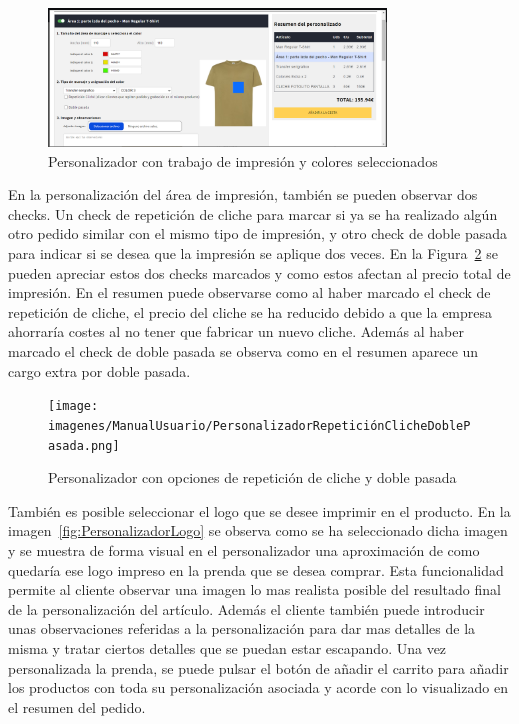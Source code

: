 \documentclass[11pt]{article}
\begin{document}
\begin{figure}[H]
    \centering
    \includegraphics[width=0.8\textwidth]{imagenes/ManualUsuario/PersonalizadorArea1ColoresSeleccionados.png}
    \caption{\label{fig:PersonalizadorColores}Personalizador con trabajo de impresión y colores seleccionados}
    \vspace{\fill}
\end{figure}

En la personalización del área de impresión, también se pueden observar dos checks. Un check de repetición de cliche para marcar si ya se ha realizado algún otro pedido similar con el mismo tipo de impresión,
y otro check de doble pasada para indicar si se desea que la impresión se aplique dos veces. En la Figura~\ref{fig:PersonalizadorCheckboxes} se pueden apreciar estos dos checks marcados y como estos
afectan al precio total de impresión. En el resumen puede observarse como al haber marcado el check de repetición de cliche, el precio del cliche se ha reducido debido a que la empresa ahorraría costes al no tener que 
fabricar un nuevo cliche. Además al haber marcado el check de doble pasada se observa como en el resumen aparece un cargo extra por doble pasada.

\begin{figure}[H]
    \centering
    \texttt{[image: imagenes/ManualUsuario/PersonalizadorRepeticiónClicheDoblePasada.png]}
    \caption{\label{fig:PersonalizadorCheckboxes}Personalizador con opciones de repetición de cliche y doble pasada}
    \vspace{\fill}
\end{figure}

También es posible seleccionar el logo que se desee imprimir en el producto. En la imagen~\ref{fig:PersonalizadorLogo} se observa como se ha seleccionado dicha imagen y se muestra de forma visual en el personalizador una 
aproximación de como quedaría ese logo impreso en la prenda que se desea comprar. Esta funcionalidad permite al cliente observar una imagen lo mas realista posible del resultado final
de la personalización del artículo. Además el cliente también puede introducir unas observaciones referidas a la personalización para dar mas detalles de la misma y tratar ciertos detalles que se puedan
estar escapando. Una vez personalizada la prenda, se puede pulsar el botón de añadir el carrito para añadir los productos con toda su personalización asociada y acorde con
lo visualizado en el resumen del pedido.
\end{document}
